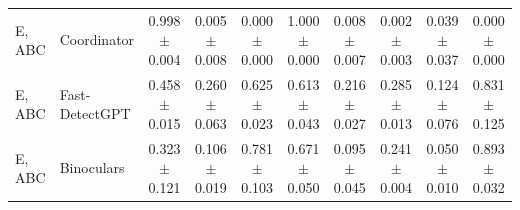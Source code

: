 \begin{table}[t]
\begin{tabular}{@{}llcccccccc@{}}
E, ABC & Coordinator & 0.998$\pm$0.004 & 0.005$\pm$0.008 & 0.000$\pm$0.000 & 1.000$\pm$0.000 & 0.008$\pm$0.007 & 0.002$\pm$0.003 & 0.039$\pm$0.037 & 0.000$\pm$0.000 \\
E, ABC & Fast-DetectGPT & 0.458$\pm$0.015 & 0.260$\pm$0.063 & 0.625$\pm$0.023 & 0.613$\pm$0.043 & 0.216$\pm$0.027 & 0.285$\pm$0.013 & 0.124$\pm$0.076 & 0.831$\pm$0.125 \\
E, ABC & Binoculars & 0.323$\pm$0.121 & 0.106$\pm$0.019 & 0.781$\pm$0.103 & 0.671$\pm$0.050 & 0.095$\pm$0.045 & 0.241$\pm$0.004 & 0.050$\pm$0.010 & 0.893$\pm$0.032 \\
\bottomrule
\end{tabular}
\end{table}
